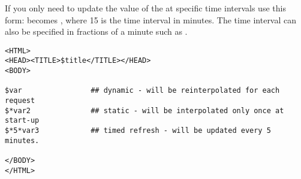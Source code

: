 If you only need to update the value of the  at specific time intervals use
this form:  becomes  , where 15 is the time interval in
minutes.  The time interval can also be specified in fractions of a minute such
as .

\begin{verbatim}
<HTML>
<HEAD><TITLE>$title</TITLE></HEAD>
<BODY>

$var                ## dynamic - will be reinterpolated for each request
$*var2              ## static - will be interpolated only once at start-up
$*5*var3            ## timed refresh - will be updated every 5 minutes.

</BODY>
</HTML>
\end{verbatim}


